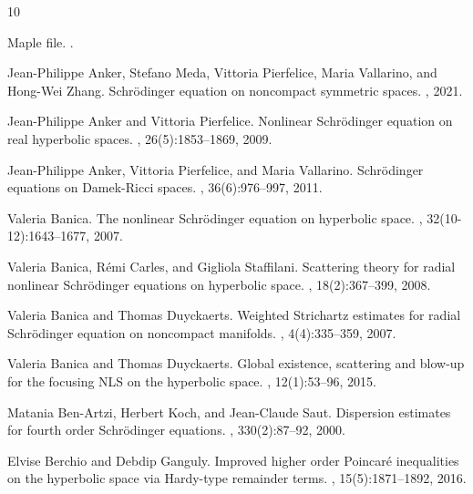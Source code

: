 \documentclass[10pt,leqno]{amsart}
\numberwithin{equation}{section}
\begin{document}
\begin{thebibliography}{10}

Maple file.
.

Jean-Philippe Anker, Stefano Meda, Vittoria Pierfelice, Maria Vallarino, and
  Hong-Wei Zhang.
\newblock Schr\"odinger equation on noncompact symmetric spaces.
, 2021.

Jean-Philippe Anker and Vittoria Pierfelice.
\newblock Nonlinear {S}chr\"{o}dinger equation on real hyperbolic spaces.
,
  26(5):1853--1869, 2009.

Jean-Philippe Anker, Vittoria Pierfelice, and Maria Vallarino.
\newblock Schr\"{o}dinger equations on {D}amek-{R}icci spaces.
, 36(6):976--997, 2011.

Valeria Banica.
\newblock The nonlinear {S}chr\"{o}dinger equation on hyperbolic space.
, 32(10-12):1643--1677,
  2007.

Valeria Banica, R\'{e}mi Carles, and Gigliola Staffilani.
\newblock Scattering theory for radial nonlinear {S}chr\"{o}dinger equations on
  hyperbolic space.
, 18(2):367--399, 2008.

Valeria Banica and Thomas Duyckaerts.
\newblock Weighted {S}trichartz estimates for radial {S}chr\"{o}dinger equation
  on noncompact manifolds.
, 4(4):335--359, 2007.

Valeria Banica and Thomas Duyckaerts.
\newblock Global existence, scattering and blow-up for the focusing {NLS} on
  the hyperbolic space.
, 12(1):53--96, 2015.

Matania Ben-Artzi, Herbert Koch, and Jean-Claude Saut.
\newblock Dispersion estimates for fourth order {S}chr\"{o}dinger equations.
, 330(2):87--92, 2000.

Elvise Berchio and Debdip Ganguly.
\newblock Improved higher order {P}oincar\'{e} inequalities on the hyperbolic
  space via {H}ardy-type remainder terms.
, 15(5):1871--1892, 2016.


\end{thebibliography}
\end{document}
